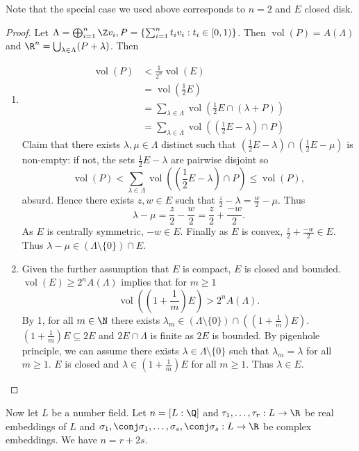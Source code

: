 \documentclass[a4paper]{article}
\DeclareMathOperator{\vol}{vol}
\begin{document}
Note that the special case we used above corresponds to \(n = 2\) and \(E\) closed disk.

\begin{proof}
  Let \(\Lambda = \bigoplus_{i = 1}^n \Z v_i, P = \left\{ \sum_{i = 1}^n t_iv_i: t_i \in [0, 1) \right\}\). Then \(\vol(P) = A(\Lambda)\) and \(\R^n = \bigcup_{\lambda \in \Lambda} (P + \lambda)\). Then
  \begin{enumerate}
  \item
    \begin{align*}
      \vol(P)
      &< \frac{1}{2^n} \vol(E) \\
      &= \vol(\frac{1}{2}E) \\
      &= \sum_{\lambda \in \Lambda} \vol(\frac{1}{2}E \cap (\lambda + P)) \\
      &= \sum_{\lambda \in \Lambda} \vol((\frac{1}{2}E - \lambda) \cap P)
    \end{align*}
    Claim that there exists \(\lambda, \mu \in \Lambda\) distinct such that \((\frac{1}{2}E - \lambda) \cap (\frac{1}{2}E - \mu)\) is non-empty: if not, the sets \(\frac{1}{2}E - \lambda\) are pairwise disjoint so
    \[
      \vol(P) < \sum_{\lambda \in \Lambda} \vol((\frac{1}{2}E - \lambda) \cap P) \leq \vol(P),
    \]
    absurd. Hence there exists \(z, w \in E\) such that \(\frac{z}{2} - \lambda = \frac{w}{2} - \mu\). Thus
    \[
      \lambda - \mu = \frac{z}{2} - \frac{w}{2} = \frac{z}{2} + \frac{-w}{2}.
    \]
    As \(E\) is centrally symmetric, \(-w \in E\). Finally as \(E\) is convex, \(\frac{z}{2} + \frac{-w}{2} \in E\). Thus \(\lambda - \mu \in (\Lambda \setminus \{0\}) \cap E\).
  \item Given the further assumption that \(E\) is compact, \(E\) is closed and bounded. \(\vol(E) \geq 2^n A(\Lambda)\) implies that for \(m \geq 1\)
    \[
      \vol((1 + \frac{1}{m})E) > 2^n A(\Lambda).
    \]
    By 1, for all \(m \in \N\) there exists \(\lambda_m \in (\Lambda \setminus \{0\}) \cap ((1 + \frac{1}{m})E)\). \((1 + \frac{1}{m}) E \subseteq 2E\) and \(2E \cap \Lambda\) is finite as \(2E\) is bounded. By pigenhole principle, we can assume there exists \(\lambda \in \Lambda \setminus \{0\}\) such that \(\lambda_m = \lambda\) for all \(m \geq 1\). \(E\) is closed and \(\lambda \in (1 + \frac{1}{m})E\) for all \(m \geq 1\). Thus \(\lambda \in E\).
  \end{enumerate}
\end{proof}

Now let \(L\) be a number field. Let \(n = [L:\Q]\) and \(\tau_1, \dots, \tau_r: L \to \R\) be real embeddings of \(L\) and \(\sigma_1, \conj \sigma_1, \dots, \sigma_s, \conj \sigma_s: L \to \R\) be complex embeddings. We have \(n = r + 2s\).
\end{document}

